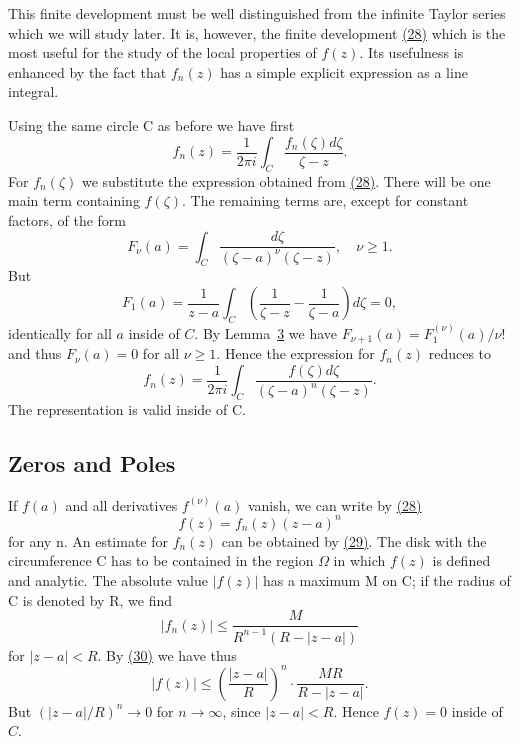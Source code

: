 This finite development must be well distinguished from the infinite Taylor series which we will study later. It is, however, the finite development \hyperref[eq:4.28]{(28)} which is the most useful for the study of the local properties of $f(z)$. Its usefulness is enhanced by the fact that $f_{n}(z)$ has a simple explicit expression as a line integral.

Using the same circle C as before we have first
\begin{equation*}
f _ {n} (z) = \frac {1}{2 \pi i} \int_ {C} \frac {f _ {n} (\zeta) d \zeta}{\zeta - z}.
\end{equation*}
For $f_{n}(\zeta)$ we substitute the expression obtained from \hyperref[eq:4.28]{(28)}. There will be one main term containing $f(\zeta)$. The remaining terms are, except for constant factors, of the form
\begin{equation*}
F _ {\nu} (a) = \int_ {C} \frac {d \zeta}{(\zeta - a) ^ {\nu} (\zeta - z)}, \quad \nu \geq 1.
\end{equation*}
But
\begin{equation*}
F _ {1} (a) = \frac {1}{z - a} \int_ {C} \left(\frac {1}{\zeta - z} - \frac {1}{\zeta - a}\right) d \zeta = 0,
\end{equation*}
identically for all $a$ inside of $C$. By Lemma~\hyperref[lem:4.3]{3} we have $F_{\nu + 1}(a) = F_1^{(\nu)}(a) / \nu!$ and thus $F_{\nu}(a) = 0$ for all $\nu \geq 1$. Hence the expression for $f_n(z)$ reduces to
\begin{equation*}
f _ {n} (z) = \frac {1}{2 \pi i} \int_ {C} \frac {f (\zeta) d \zeta}{(\zeta - a) ^ {n} (\zeta - z)}.\tag{29}\label{eq:4.29}
\end{equation*}
The representation is valid inside of C.

\setcounter{section}{3}\setcounter{subsection}{1}\subsection{Zeros and Poles}\label{sec:4.3.2}
If $f(a)$ and all derivatives $f^{(\nu)}(a)$ vanish, we can write by \hyperref[eq:4.28]{(28)}
\begin{equation*}
f (z) = f _ {n} (z) (z - a) ^ {n}\tag{30}\label{eq:4.30}
\end{equation*}
for any n. An estimate for $f_{n}(z)$ can be obtained by \hyperref[eq:4.29]{(29)}. The disk with the circumference C has to be contained in the region $\Omega$ in which $f(z)$ is defined and analytic. The absolute value $|f(z)|$ has a maximum M on C; if the radius of C is denoted by R, we find
\begin{equation*}
\left| f _ {n} (z) \right| \leq \frac {M}{R ^ {n - 1} (R - | z - a |)}
\end{equation*}
for $|z - a| < R$. By \hyperref[eq:4.30]{(30)} we have thus
\begin{equation*}
| f (z) | \leq \left(\frac {| z - a |}{R}\right) ^ {n} \cdot \frac {M R}{R - | z - a |}.
\end{equation*}
But $(|z - a| / R)^n \to 0$ for $n \to \infty$, since $|z - a| < R$. Hence $f(z) = 0$ inside of $C$.


